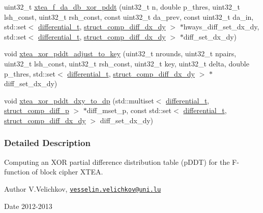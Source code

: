\begin{DoxyCompactItemize}
\item 
uint32\-\_\-t \hyperlink{xtea-f-xor-pddt_8cc_a515d006e47b6956f75dd6814ed403324}{xtea\-\_\-f\-\_\-da\-\_\-db\-\_\-xor\-\_\-pddt} (uint32\-\_\-t n, double p\-\_\-thres, uint32\-\_\-t lsh\-\_\-const, uint32\-\_\-t rsh\-\_\-const, const uint32\-\_\-t da\-\_\-prev, const uint32\-\_\-t da\-\_\-in, std\-::set$<$ \hyperlink{structdifferential__t}{differential\-\_\-t}, \hyperlink{structstruct__comp__diff__dx__dy}{struct\-\_\-comp\-\_\-diff\-\_\-dx\-\_\-dy} $>$ $\ast$hways\-\_\-diff\-\_\-set\-\_\-dx\-\_\-dy, std\-::set$<$ \hyperlink{structdifferential__t}{differential\-\_\-t}, \hyperlink{structstruct__comp__diff__dx__dy}{struct\-\_\-comp\-\_\-diff\-\_\-dx\-\_\-dy} $>$ $\ast$diff\-\_\-set\-\_\-dx\-\_\-dy)
\item 
void \hyperlink{xtea-f-xor-pddt_8cc_a2bfe2f1348b48d45e79183f2c8582a65}{xtea\-\_\-xor\-\_\-pddt\-\_\-adjust\-\_\-to\-\_\-key} (uint32\-\_\-t nrounds, uint32\-\_\-t npairs, uint32\-\_\-t lsh\-\_\-const, uint32\-\_\-t rsh\-\_\-const, uint32\-\_\-t key, uint32\-\_\-t delta, double p\-\_\-thres, std\-::set$<$ \hyperlink{structdifferential__t}{differential\-\_\-t}, \hyperlink{structstruct__comp__diff__dx__dy}{struct\-\_\-comp\-\_\-diff\-\_\-dx\-\_\-dy} $>$ $\ast$diff\-\_\-set\-\_\-dx\-\_\-dy)
\item 
void \hyperlink{xtea-f-xor-pddt_8cc_ab30446d80d0a70a87e3bc306b072c176}{xtea\-\_\-xor\-\_\-pddt\-\_\-dxy\-\_\-to\-\_\-dp} (std\-::multiset$<$ \hyperlink{structdifferential__t}{differential\-\_\-t}, \hyperlink{structstruct__comp__diff__p}{struct\-\_\-comp\-\_\-diff\-\_\-p} $>$ $\ast$diff\-\_\-mset\-\_\-p, const std\-::set$<$ \hyperlink{structdifferential__t}{differential\-\_\-t}, \hyperlink{structstruct__comp__diff__dx__dy}{struct\-\_\-comp\-\_\-diff\-\_\-dx\-\_\-dy} $>$ diff\-\_\-set\-\_\-dx\-\_\-dy)
\end{DoxyCompactItemize}


\subsubsection{\-Detailed \-Description}
\-Computing an \-X\-O\-R partial difference distribution table (p\-D\-D\-T) for the \-F-\/function of block cipher \-X\-T\-E\-A. \begin{DoxyAuthor}{\-Author}
\-V.\-Velichkov, \href{mailto:vesselin.velichkov@uni.lu}{\tt vesselin.\-velichkov@uni.\-lu} 
\end{DoxyAuthor}
\begin{DoxyDate}{\-Date}
2012-\/2013 
\end{DoxyDate}


